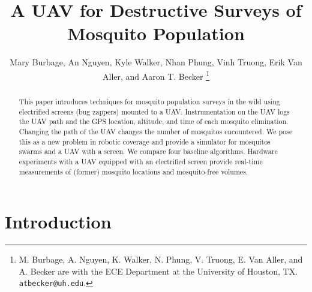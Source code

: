 \documentclass[letterpaper, 10 pt, conference]{ieeeconf}  %
\title{\LARGE \bf
A UAV for Destructive Surveys of Mosquito Population
}
\author{Mary Burbage, An Nguyen, Kyle Walker, Nhan Phung, Vinh Truong, Erik Van Aller, and Aaron T. Becker%
\thanks{M. Burbage, A. Nguyen, K. Walker, N. Phung, V. Truong, E. Van Aller, and A. Becker are with the ECE Department at the University of Houston, TX.
        {\tt\small atbecker@uh.edu}.}%
}
\begin{document}
\maketitle
\thispagestyle{empty}
\pagestyle{empty}


\begin{abstract}
This paper introduces techniques for mosquito population surveys in the wild using electrified screens (bug zappers) mounted to a UAV. Instrumentation on the UAV logs the UAV path and the GPS location, altitude, and time of each mosquito elimination. Changing the path of the UAV changes the number of mosquitos encountered.  We pose this as a new problem in robotic coverage and provide a simulator for mosquitos swarms and a UAV with a screen. We compare four baseline algorithms.
  Hardware experiments with a UAV equipped with an electrified screen provide real-time measurements of (former) mosquito locations and mosquito-free volumes. 
\end{abstract}




\section{Introduction}
\end{document}
